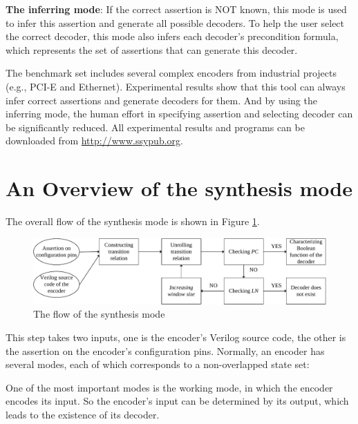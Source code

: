 \documentclass[runningheads,a4paper]{llncs}
\begin{document}
\textbf{The inferring mode}:
If the correct assertion is NOT known,
this mode is used to infer this assertion\cite{ShengYuShen:iccad11} and generate all possible decoders\cite{ShengYuShen:tcad12}.
To help the user select the correct decoder,
this mode also infers each decoder's precondition formula,
which represents the set of assertions that can generate this decoder.

The benchmark set includes several complex encoders from industrial projects
(e.g.,
PCI-E\cite{PCIESPEC} and Ethernet\cite{IEEE80232002}).
Experimental results show that
this tool can always infer correct assertions and generate decoders for them.
And by using the inferring mode,
the human effort in specifying assertion and selecting decoder can be significantly reduced.
All experimental results and programs can be downloaded from \url{http://www.ssypub.org}.


\section{An Overview of the synthesis mode}\label{sec_syn}

The overall flow of the synthesis mode is shown in Figure \ref{fig_halting}.
\begin{figure}[t]
\centering
\includegraphics[width=\textwidth]{halting}
\caption{The flow of the synthesis mode}
\label{fig_halting}
\end{figure}

\vspace{0.2cm}
\vspace{0.2cm}

This step takes two inputs,
one is the encoder's Verilog source code,
the other is the assertion on the encoder's configuration pins.
Normally,
an encoder has several modes,
each of which corresponds to a non-overlapped state set:

One of the most important modes is the working mode,
in which the encoder encodes its input.
So the encoder's input can be determined by its output,
which leads to the existence of its decoder.
\end{document}
